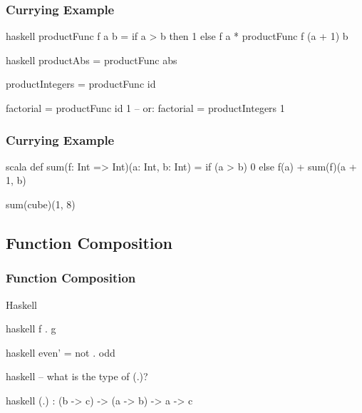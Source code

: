\documentclass[dvipsnames]{beamer}
\theoremstyle{plain}
\begin{document}
\begin{frame}[fragile]
  \frametitle{Currying Example}

  \begin{example}
    \begin{pygments}{haskell}
productFunc f a b =
    if a > b then 1 else f a * productFunc f (a + 1) b
    \end{pygments}

    \pause
    \medskip
    \begin{pygments}{haskell}
productAbs = productFunc abs

productIntegers = productFunc id

factorial = productFunc id 1
-- or: factorial = productIntegers 1
    \end{pygments}
  \end{example}
\end{frame}

\begin{frame}[fragile]
  \frametitle{Currying Example}

  \begin{example}
    \begin{pygments}{scala}
def sum(f: Int => Int)(a: Int, b: Int) =
    if (a > b) 0
    else f(a) + sum(f)(a + 1, b)

sum(cube)(1, 8)
    \end{pygments}
  \end{example}
\end{frame}

\subsection{Function Composition}

\begin{frame}[fragile]
  \frametitle{Function Composition}

  \begin{block}{Haskell}
    \begin{pygments}{haskell}
f . g
    \end{pygments}
  \end{block}

  \pause
  \begin{example}
    \begin{pygments}{haskell}
even' = not . odd
    \end{pygments}

    \pause
    \begin{pygments}{haskell}
-- what is the type of (.)?
    \end{pygments}

    \pause
    \begin{pygments}{haskell}
(.) : (b -> c) -> (a -> b) -> a -> c
    \end{pygments}
  \end{example}
\end{frame}
\end{document}

